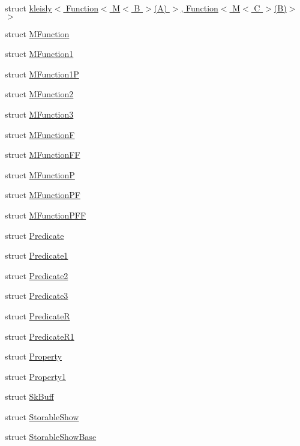 \begin{DoxyCompactItemize}
\item 
struct \hyperlink{structpfq_1_1lang_1_1kleisly_3_01Function_3_01M_3_01B_01_4_07A_08_01_4_00_01Function_3_01M_3_01C_01_4_07B_08_4_01_4}{kleisly$<$ Function$<$ M$<$ B $>$(\+A) $>$, Function$<$ M$<$ C $>$(\+B)$>$ $>$}
\item 
struct \hyperlink{structpfq_1_1lang_1_1MFunction}{M\+Function}
\item 
struct \hyperlink{structpfq_1_1lang_1_1MFunction1}{M\+Function1}
\item 
struct \hyperlink{structpfq_1_1lang_1_1MFunction1P}{M\+Function1\+P}
\item 
struct \hyperlink{structpfq_1_1lang_1_1MFunction2}{M\+Function2}
\item 
struct \hyperlink{structpfq_1_1lang_1_1MFunction3}{M\+Function3}
\item 
struct \hyperlink{structpfq_1_1lang_1_1MFunctionF}{M\+Function\+F}
\item 
struct \hyperlink{structpfq_1_1lang_1_1MFunctionFF}{M\+Function\+F\+F}
\item 
struct \hyperlink{structpfq_1_1lang_1_1MFunctionP}{M\+Function\+P}
\item 
struct \hyperlink{structpfq_1_1lang_1_1MFunctionPF}{M\+Function\+P\+F}
\item 
struct \hyperlink{structpfq_1_1lang_1_1MFunctionPFF}{M\+Function\+P\+F\+F}
\item 
struct \hyperlink{structpfq_1_1lang_1_1Predicate}{Predicate}
\item 
struct \hyperlink{structpfq_1_1lang_1_1Predicate1}{Predicate1}
\item 
struct \hyperlink{structpfq_1_1lang_1_1Predicate2}{Predicate2}
\item 
struct \hyperlink{structpfq_1_1lang_1_1Predicate3}{Predicate3}
\item 
struct \hyperlink{structpfq_1_1lang_1_1PredicateR}{Predicate\+R}
\item 
struct \hyperlink{structpfq_1_1lang_1_1PredicateR1}{Predicate\+R1}
\item 
struct \hyperlink{structpfq_1_1lang_1_1Property}{Property}
\item 
struct \hyperlink{structpfq_1_1lang_1_1Property1}{Property1}
\item 
struct \hyperlink{structpfq_1_1lang_1_1SkBuff}{Sk\+Buff}
\item 
struct \hyperlink{structpfq_1_1lang_1_1StorableShow}{Storable\+Show}
\item 
struct \hyperlink{structpfq_1_1lang_1_1StorableShowBase}{Storable\+Show\+Base}
\end{DoxyCompactItemize}
